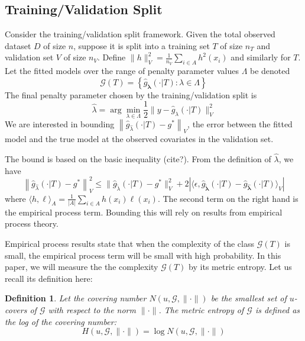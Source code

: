 \documentclass[12pt]{article}
\newtheorem{definition}{Definition}
\begin{document}
\subsection{Training/Validation Split}

Consider the training/validation split framework. Given the total observed dataset $D$ of size $n$, suppose it is split into a training set $T$ of size $n_T$ and validation set $V$ of size $n_V$. Define $\| h \|_V^2 = \frac{1}{n_V}\sum_{i\in A} h^2(x_i)$ and similarly for $T$. Let the fitted models over the range of penalty parameter values $\Lambda$ be denoted
\begin{equation}
\label{function_class_GT}
\mathcal{G}(T) = \left \{ \hat{g}_{\boldsymbol \lambda}(\cdot | T) : \lambda \in \Lambda  \right \}
\end{equation}
The final penalty parameter chosen by the training/validation split is
\begin{equation}
\label{cv_lambda}
\hat{\lambda} = \arg\min_{\lambda\in\Lambda} \frac{1}{2}  \| y-\hat{g}_{\lambda}(\cdot | T) \|_{V}^{2}
\end{equation} 
We are interested in bounding $\left \|\hat{g}_{\hat{\lambda} }(\cdot | T) - g^* \right \|_V$, the error between the fitted model and the true model at the observed covariates in the validation set. 

The bound is based on the basic inequality (cite?). From the definition of $\hat{\lambda}$, we have
\begin{equation}
\label{basic_ineq}
\left \|\hat{g}_{\hat{\lambda} }(\cdot | T) - g^* \right \|_V^2
\le
\| \hat{g}_{\tilde{\lambda}}(\cdot | T) - g^*\|_V^2 + 
2 \left | \langle \epsilon, \hat{g}_{\tilde{\boldsymbol \lambda}}(\cdot | T) - \hat{g}_{\hat{\boldsymbol \lambda}}(\cdot | T) \rangle_V \right |
\end{equation}
where $\langle h, \ell \rangle_A = \frac{1}{|A|}\sum_{i\in A} h(x_i) \ell(x_i)$. The second term on the right hand is the empirical process term. Bounding this will rely on results from empirical process theory.

Empirical process results state that when the complexity of the class $\mathcal{G}(T)$ is small, the empirical process term will be small with high probability. In this paper, we will measure the the complexity $\mathcal{G}(T)$ by its metric entropy. Let us recall its definition here:

\begin{definition}
Let the covering number $N(u, \mathcal{G}, \| \cdot \|)$ be the smallest set of $u$-covers of $\mathcal{G}$ with respect to the norm $\| \cdot \|$. The metric entropy of $\mathcal{G}$ is defined as the log of the covering number:
\begin{equation}
H (u, \mathcal{G}, \| \cdot \| ) = \log N(u, \mathcal{G}, \| \cdot \|)
\end{equation}
\end{definition}
\end{document}
